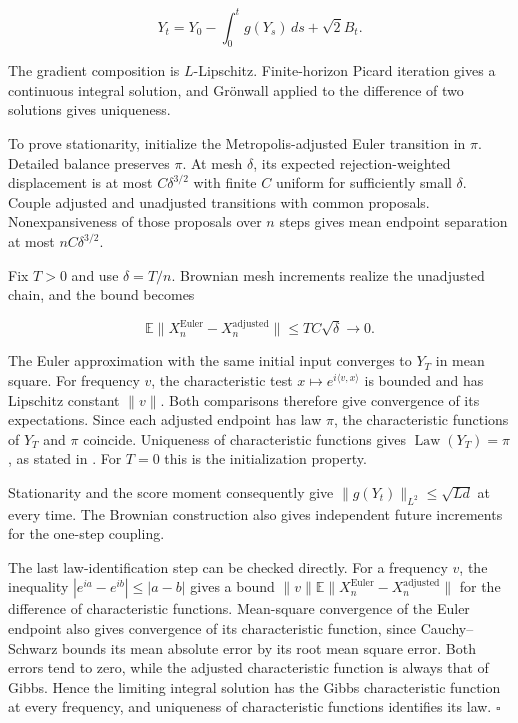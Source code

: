 \documentclass[11pt,a4paper]{article}
\begin{document}
\[Y_t=Y_0-\int_0^t g(Y_s)\,ds+\sqrt2 B_t.\]

The gradient composition is \(L\)-Lipschitz. Finite-horizon Picard iteration gives a continuous integral solution, and Grönwall applied to the difference of two solutions gives uniqueness.



To prove stationarity, initialize the Metropolis-adjusted Euler transition in \(\pi\). Detailed balance preserves \(\pi\). At mesh \(\delta\), its expected rejection-weighted displacement is at most \(C\delta^{3/2}\) with finite \(C\) uniform for sufficiently small \(\delta\). Couple adjusted and unadjusted transitions with common proposals. Nonexpansiveness of those proposals over \(n\) steps gives mean endpoint separation at most \(nC\delta^{3/2}\).



Fix \(T>0\) and use \(\delta=T/n\). Brownian mesh increments realize the unadjusted chain, and the bound becomes

\[\mathbb E\|X_n^{\mathrm{Euler}}-X_n^{\mathrm{adjusted}}\|
\le TC\sqrt\delta\longrightarrow0.\]

The Euler approximation with the same initial input converges to \(Y_T\) in mean square. For frequency \(v\), the characteristic test \(x\mapsto e^{i\langle v,x\rangle}\) is bounded and has Lipschitz constant \(\|v\|\). Both comparisons therefore give convergence of its expectations. Since each adjusted endpoint has law \(\pi\), the characteristic functions of \(Y_T\) and \(\pi\) coincide. Uniqueness of characteristic functions gives \(\operatorname{Law}(Y_T)=\pi\), as stated in \cite[Section~3.42.7]{LangevinLean2026ULASC}. For \(T=0\) this is the initialization property.



Stationarity and the score moment consequently give \(\|g(Y_t)\|_{L^2}\le\sqrt{Ld}\) at every time. The Brownian construction also gives independent future increments for the one-step coupling.




The last law-identification step can be checked directly. For a frequency \(v\), the inequality \(|e^{ia}-e^{ib}|\le|a-b|\) gives a bound \(\|v\|\mathbb E\|X_n^{\mathrm{Euler}}-X_n^{\mathrm{adjusted}}\|\) for the difference of characteristic functions. Mean-square convergence of the Euler endpoint also gives convergence of its characteristic function, since Cauchy–Schwarz bounds its mean absolute error by its root mean square error. Both errors tend to zero, while the adjusted characteristic function is always that of Gibbs. Hence the limiting integral solution has the Gibbs characteristic function at every frequency, and uniqueness of characteristic functions identifies its law. \(\square\)
\end{document}
